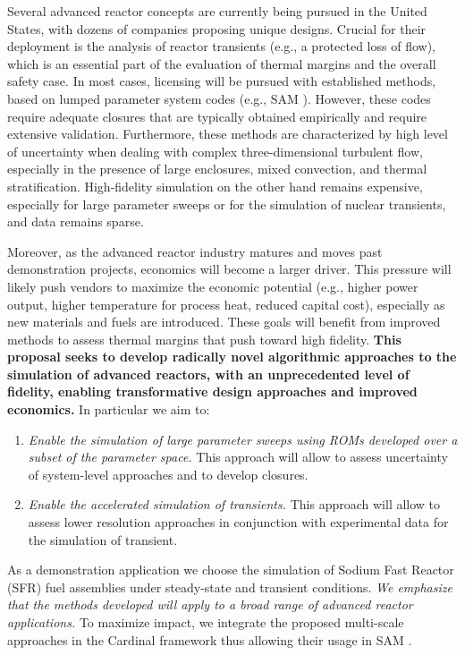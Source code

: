 Several  advanced reactor concepts are currently being pursued in the United
States, with dozens of companies proposing unique designs. Crucial for their
deployment is the analysis of  reactor transients (e.g., a protected loss of
flow), which is an essential part of the evaluation of thermal margins and the overall
safety case.  In most cases, licensing will be pursued with established
methods, based on lumped parameter system codes (e.g., SAM \cite{hu2021}).
However, these codes require adequate closures that are typically obtained
empirically and require extensive validation. Furthermore, these methods are
characterized by high level of uncertainty when dealing with complex
three-dimensional turbulent flow, especially in the presence of large
enclosures, mixed convection, and thermal stratification. High-fidelity
simulation on the other hand remains expensive, especially for
large parameter sweeps or for the simulation of nuclear transients, and data
remains sparse.

Moreover, as the advanced reactor industry matures and moves past demonstration
projects, economics will become a larger driver. This pressure will likely push
vendors to maximize the economic potential (e.g., higher power output,
higher temperature for process heat, reduced capital cost), especially as new
materials and fuels are introduced. These goals will benefit from 
improved methods to assess thermal margins that push toward high fidelity.
\textbf{This proposal seeks to develop radically novel algorithmic approaches
to the simulation of advanced reactors, with an unprecedented level of
fidelity, enabling transformative design approaches and improved economics.}
In particular we aim to:
\begin{enumerate}
%
   \item \textit{Enable the simulation of large parameter sweeps using 
   ROMs developed over a subset of the parameter space.} This approach
   will allow to assess uncertainty of system-level approaches and to develop
   closures.
%
   \item \textit{Enable the accelerated simulation of transients.}
   This approach will allow to assess lower resolution approaches in conjunction
   with experimental data for the simulation of transient.
\\[-5ex]
\end{enumerate}
As a demonstration application we choose the simulation of Sodium Fast Reactor
(SFR) fuel assemblies under steady-state and transient conditions. \textit{We
emphasize that the methods developed will apply to a broad range of advanced
reactor applications.} To maximize impact, we integrate the proposed multi-scale approaches in the Cardinal \cite{cardinal} framework thus allowing their usage in SAM \cite{hu2021}.

